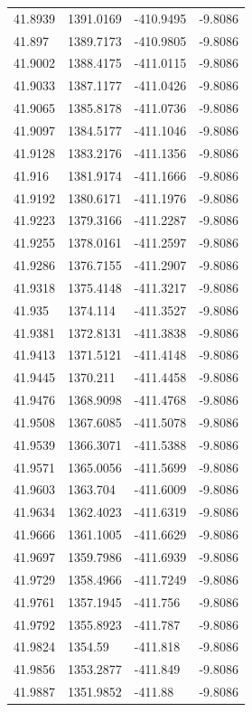 \begin{table}[H]
\begin{tabular}{llll}
41.8939 & 1391.0169 & -410.9495 & -9.8086 \\
41.897 & 1389.7173 & -410.9805 & -9.8086 \\
41.9002 & 1388.4175 & -411.0115 & -9.8086 \\
41.9033 & 1387.1177 & -411.0426 & -9.8086 \\
41.9065 & 1385.8178 & -411.0736 & -9.8086 \\
41.9097 & 1384.5177 & -411.1046 & -9.8086 \\
41.9128 & 1383.2176 & -411.1356 & -9.8086 \\
41.916 & 1381.9174 & -411.1666 & -9.8086 \\
41.9192 & 1380.6171 & -411.1976 & -9.8086 \\
41.9223 & 1379.3166 & -411.2287 & -9.8086 \\
41.9255 & 1378.0161 & -411.2597 & -9.8086 \\
41.9286 & 1376.7155 & -411.2907 & -9.8086 \\
41.9318 & 1375.4148 & -411.3217 & -9.8086 \\
41.935 & 1374.114 & -411.3527 & -9.8086 \\
41.9381 & 1372.8131 & -411.3838 & -9.8086 \\
41.9413 & 1371.5121 & -411.4148 & -9.8086 \\
41.9445 & 1370.211 & -411.4458 & -9.8086 \\
41.9476 & 1368.9098 & -411.4768 & -9.8086 \\
41.9508 & 1367.6085 & -411.5078 & -9.8086 \\
41.9539 & 1366.3071 & -411.5388 & -9.8086 \\
41.9571 & 1365.0056 & -411.5699 & -9.8086 \\
41.9603 & 1363.704 & -411.6009 & -9.8086 \\
41.9634 & 1362.4023 & -411.6319 & -9.8086 \\
41.9666 & 1361.1005 & -411.6629 & -9.8086 \\
41.9697 & 1359.7986 & -411.6939 & -9.8086 \\
41.9729 & 1358.4966 & -411.7249 & -9.8086 \\
41.9761 & 1357.1945 & -411.756 & -9.8086 \\
41.9792 & 1355.8923 & -411.787 & -9.8086 \\
41.9824 & 1354.59 & -411.818 & -9.8086 \\
41.9856 & 1353.2877 & -411.849 & -9.8086 \\
41.9887 & 1351.9852 & -411.88 & -9.8086 \\

\end{tabular}
\end{table}

